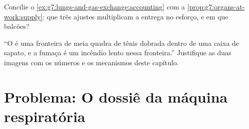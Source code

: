 \begin{exercise}[$\star\star$]\label{exo:g7:lungs-and-gas-exchange:11}
Concilie o \cref{ex:g7:lungs-and-gas-exchange:accounting} com a
\cref{prop:g7:organs-at-work:supply}: que três ajustes multiplicam a
entrega no esforço, e em que balcões?
\end{exercise}

\begin{exercise}[$\star\star\star$]\label{exo:g7:lungs-and-gas-exchange:12}
``O  é uma fronteira de meia quadra de tênis dobrada dentro de
uma caixa de sapato, e a fumaça é um incêndio lento nessa fronteira.''
Justifique as duas imagens com os números e os mecanismos deste
capítulo.
\end{exercise}

\section{Problema: O dossiê da máquina respiratória}

